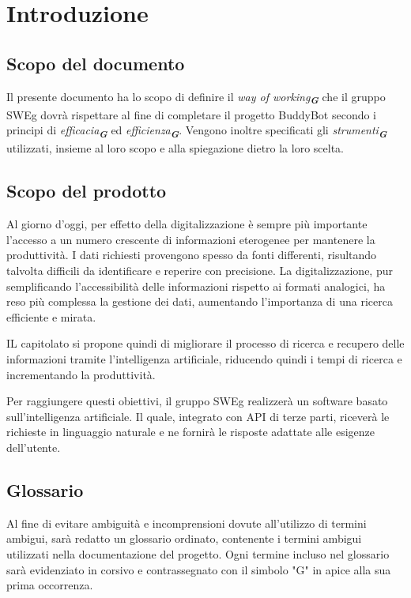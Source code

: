 


\section{Introduzione}
\label{sec:introduzione}

\subsection{Scopo del documento}
Il presente documento ha lo scopo di definire il \emph{way of working}\textsubscript{\textit{\textbf{G}}} che il gruppo SWEg dovrà rispettare al fine di completare il progetto BuddyBot secondo i principi di \emph{efficacia}\textsubscript{\textit{\textbf{G}}} ed \emph{efficienza}\textsubscript{\textit{\textbf{G}}}.
Vengono inoltre specificati gli \emph{strumenti}\textsubscript{\textit{\textbf{G}}} utilizzati, insieme al loro scopo e alla spiegazione dietro la loro scelta.
\subsection{Scopo del prodotto}
Al giorno d'oggi, per effetto della digitalizzazione è sempre più importante l'accesso a un numero crescente di informazioni eterogenee per mantenere la produttività. I dati richiesti provengono spesso da fonti differenti, risultando talvolta difficili da identificare e reperire con precisione. La digitalizzazione, pur semplificando l'accessibilità delle informazioni rispetto ai formati analogici, ha reso più complessa la gestione dei dati, aumentando l'importanza di una ricerca efficiente e mirata.

IL capitolato si propone quindi di migliorare il processo di ricerca e recupero delle informazioni tramite l'intelligenza artificiale, riducendo quindi i tempi di ricerca e incrementando la produttività.

Per raggiungere questi obiettivi, il gruppo SWEg realizzerà un software basato sull'intelligenza artificiale. Il quale, integrato con API di terze parti, riceverà le richieste in linguaggio naturale e ne fornirà le risposte adattate alle esigenze dell'utente.
\subsection{Glossario}
Al fine di evitare ambiguità e incomprensioni dovute all'utilizzo di termini ambigui, sarà redatto un glossario ordinato, contenente i termini ambigui utilizzati nella documentazione del progetto. Ogni termine incluso nel glossario sarà evidenziato in corsivo e contrassegnato con il simbolo "G" in apice alla sua prima occorrenza.

